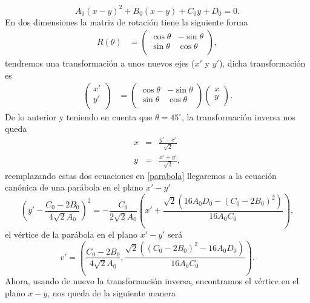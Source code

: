 \begin{equation}
    A_0(x-y)^2+B_0(x-y)+C_0y+D_0=0 \label{parabola}.
\end{equation}
En dos dimensiones la matriz de rotación tiene la siguiente forma 
\begin{align}
    R(\theta) &=  \begin{pmatrix}
           \cos{\theta} & -\sin{\theta} \\
           \sin{\theta} & \cos{\theta} \\
         \end{pmatrix},
\end{align}
tendremos una transformación a unos nuevos ejes (\(x'\) y \(y'\)), dicha transformación es
\begin{align}
    \begin{pmatrix}
           x' \\
           y' \\
         \end{pmatrix} &=  \begin{pmatrix}
           \cos{\theta} & -\sin{\theta} \\
           \sin{\theta} & \cos{\theta} \\
         \end{pmatrix} \begin{pmatrix}
           x \\
           y \\
         \end{pmatrix}.
\end{align}
De lo anterior y teniendo en cuenta que \(\theta=45^\circ\), la transformación inversa nos queda
\begin{eqnarray}
    x &=& \frac{y'-x'}{\sqrt{2}} \\
    y &=& \frac{x'+y'}{\sqrt{2}},
\end{eqnarray}
reemplazando estas dos ecuaciones en \ref{parabola} llegaremos a la ecuación canónica de una parábola en el plano \(x'-y'\)
\begin{equation}
    \left(y'-\frac{C_0-2B_0}{4\sqrt{2}A_0}\right)^2 =-\frac{C_0}{2\sqrt{2}A_0}\left(x'+\frac{\sqrt{2}(16A_0D_0-(C_0-2B_0)^2)}{16A_0C_0}\right),
\end{equation}
el vértice de la parábola en el plano \(x'-y'\) será
\begin{equation}
    v'= \left(\frac{C_0-2B_0}{4\sqrt{2}A_0},\frac{\sqrt{2}((C_0-2B_0)^2-16A_0D_0)}{16A_0C_0}\right).
\end{equation}
Ahora, usando de nuevo la transformación inversa, encontramos el vértice en el plano \(x-y\), nos queda de la siguiente manera
